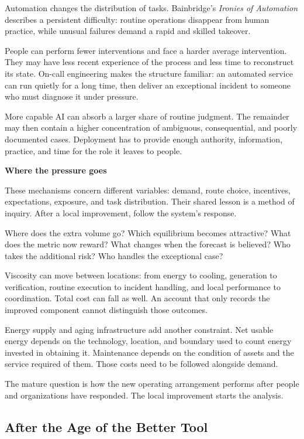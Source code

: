 \documentclass[11pt,openany]{book}
\newcommand{\subhead}[1]{\par\medskip\noindent\textbf{#1}\par\nobreak\smallskip}
\begin{document}
Automation changes the distribution of tasks. Bainbridge's \emph{Ironies of Automation} describes a persistent difficulty: routine operations disappear from human practice, while unusual failures demand a rapid and skilled takeover.\cite{bainbridge1983ironies}

People can perform fewer interventions and face a harder average intervention. They may have less recent experience of the process and less time to reconstruct its state. On-call engineering makes the structure familiar: an automated service can run quietly for a long time, then deliver an exceptional incident to someone who must diagnose it under pressure.

More capable AI can absorb a larger share of routine judgment. The remainder may then contain a higher concentration of ambiguous, consequential, and poorly documented cases. Deployment has to provide enough authority, information, practice, and time for the role it leaves to people.

\subhead{Where the pressure goes}

These mechanisms concern different variables: demand, route choice, incentives, expectations, exposure, and task distribution. Their shared lesson is a method of inquiry. After a local improvement, follow the system's response.

Where does the extra volume go? Which equilibrium becomes attractive? What does the metric now reward? What changes when the forecast is believed? Who takes the additional risk? Who handles the exceptional case?

Viscosity can move between locations: from energy to cooling, generation to verification, routine execution to incident handling, and local performance to coordination. Total cost can fall as well. An account that only records the improved component cannot distinguish those outcomes.

Energy supply and aging infrastructure add another constraint. Net usable energy depends on the technology, location, and boundary used to count energy invested in obtaining it. Maintenance depends on the condition of assets and the service required of them. Those costs need to be followed alongside demand.

The mature question is how the new operating arrangement performs after people and organizations have responded. The local improvement starts the analysis.

\subsection{After the Age of the Better Tool}
\end{document}
